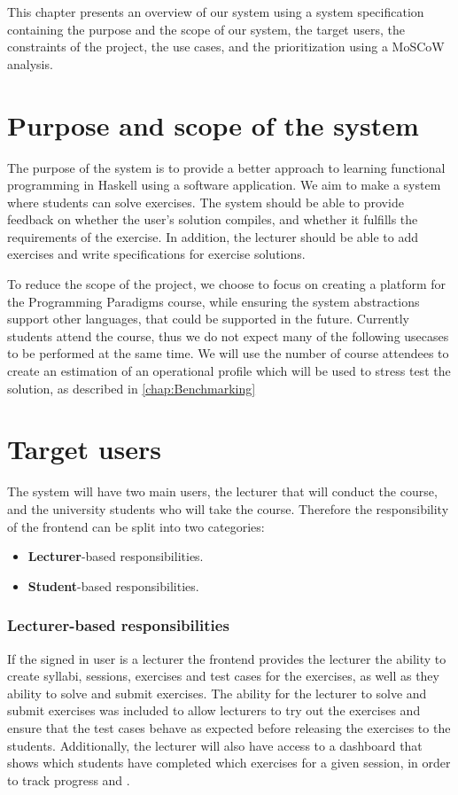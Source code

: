 This chapter presents an overview of our system using a system specification containing the purpose and the scope of our system, the target users, the constraints of the project, the use cases, and the prioritization using a MoSCoW analysis.

\section*{Purpose and scope of the system }
The purpose of the system is to provide a better approach to learning functional programming in Haskell using a software application.
We aim to make a system where students can solve exercises. The system should be able to provide feedback on whether the user's solution compiles, and whether it fulfills the requirements of the exercise. 
In addition, the lecturer should be able to add exercises and write specifications for exercise solutions.

To reduce the scope of the project, we choose to focus on creating a platform for the Programming Paradigms course, while ensuring the system abstractions support other languages, that could be supported in the future.
Currently  students attend the course, thus we do not expect many of the following usecases to be performed at the same time. 
We will use the number of course attendees to create an estimation of an operational profile which will be used to stress test the solution, as described in \ref{chap:Benchmarking}

\section*{Target users}
The system will have two main users, the lecturer that will conduct the course, and the university students who will take the course.
Therefore the responsibility of the frontend can be split into two categories: 
\begin{itemize}
    \item \textbf{Lecturer}-based responsibilities.
    \item \textbf{Student}-based responsibilities.
\end{itemize}

\subsubsection*{Lecturer-based responsibilities}
If the signed in user is a lecturer the frontend provides the lecturer the ability to create syllabi, sessions, exercises and test cases for the exercises, as well as they ability to solve and submit exercises. The ability for the lecturer to solve and submit exercises was included to allow lecturers to try out the exercises and ensure that the test cases behave as expected before releasing the exercises to the students. Additionally, the lecturer will also have access to a dashboard that shows which students have completed which exercises for a given session, in order to track progress and .

